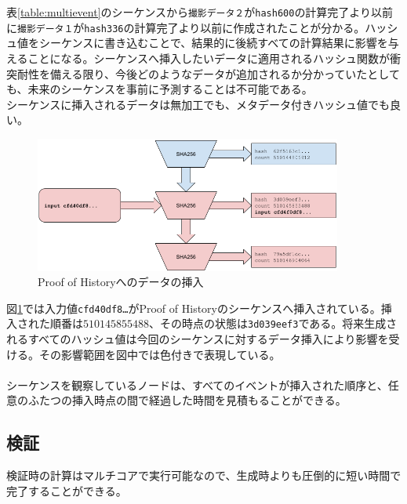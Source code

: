 \documentclass[12pt]{ltjsarticle}
\begin{document}
表\ref{table:multievent}のシーケンスから\texttt{撮影データ２}が\texttt{hash600}の計算完了より以前に\texttt{撮影データ１}が\texttt{hash336}の計算完了より以前に作成されたことが分かる。ハッシュ値をシーケンスに書き込むことで、結果的に後続すべての計算結果に影響を与えることになる。シーケンスへ挿入したいデータに適用されるハッシュ関数が衝突耐性を備える限り、今後どのようなデータが追加されるか分かっていたとしても、未来のシーケンスを事前に予測することは不可能である。\\

シーケンスに挿入されるデータは無加工でも、メタデータ付きハッシュ値でも良い。\\

\begin{figure}[h]
  \begin{center}
    \centering
    \includegraphics[width=0.9\textwidth]{figures/fig_3.png}
    \caption[Fig 3]{Proof of Historyへのデータの挿入\label{fig:poh_insert}}
  \end{center}
  \end{figure}

図\ref{fig:poh_insert}では入力値\texttt{cfd40df8\ldots}がProof of Historyのシーケンスへ挿入されている。挿入された順番は$510145855488$、その時点の状態は\texttt{3d039eef3}である。将来生成されるすべてのハッシュ値は今回のシーケンスに対するデータ挿入により影響を受ける。その影響範囲を図中では色付きで表現している。\\\\

シーケンスを観察しているノードは、すべてのイベントが挿入された順序と、任意のふたつの挿入時点の間で経過した時間を見積もることができる。

\subsection{検証}\label{poh:verify}
検証時の計算はマルチコアで実行可能なので、生成時よりも圧倒的に短い時間で完了することができる。\\
\end{document}
